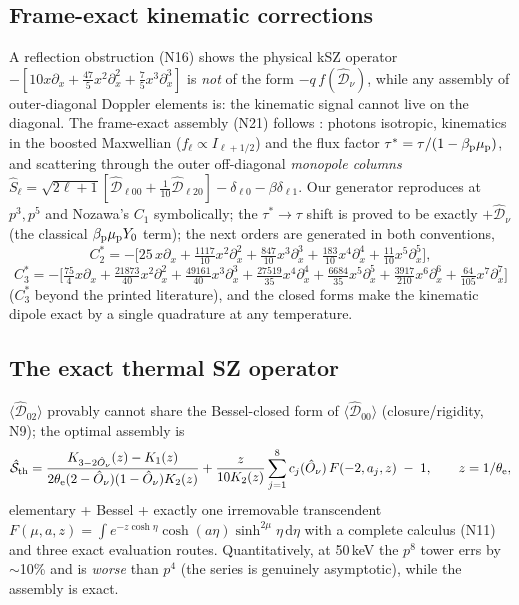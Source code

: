 \documentclass[useAMS,usenatbib]{article}
\newcommand{\Oh}{\hat{O}_\nu}
\newcommand{\Dv}{\hat{\mathcal{D}}_\nu}
\newcommand{\Do}{\hat{\mathcal{D}}}
\newcommand{\dd}{\mathrm{d}}
\begin{document}
\subsection{Frame-exact kinematic corrections}
A reflection obstruction (N16) shows the physical kSZ operator
$-[10x\partial_x + \tfrac{47}5x^2\partial_x^2 + \tfrac75x^3\partial_x^3]$ \citep{Nozawa1998} is \emph{not} of
the form $-q\,f(\Dv)$, while any assembly of outer-diagonal Doppler elements is: the kinematic signal cannot
live on the diagonal. The frame-exact assembly (N21) follows \citet[\S3]{CR26}: photons isotropic, kinematics
in the boosted Maxwellian ($f_\ell\propto I_{\ell+1/2}$) and the flux factor
$\tau^* = \tau/(1-\beta_{\rm p}\mu_{\rm p})$, and scattering through the outer off-diagonal
\emph{monopole columns} $\hat S_\ell = \sqrt{2\ell+1}[\Do_{\ell00}+\tfrac1{10}\Do_{\ell20}] - \delta_{\ell0}
- \beta\delta_{\ell1}$. Our generator reproduces \citet[Eq.~28]{CR26} at $p^3, p^5$ and Nozawa's $C_1$
symbolically; the $\tau^*\!\to\!\tau$ shift is proved to be exactly $+\Dv$ (the classical
$\beta_{\rm p}\mu_{\rm p}Y_0$ term); the next orders are generated in both conventions,
\begin{equation}
  C_2^{*} = -\Big[25\,x\partial_x + \tfrac{1117}{10}x^2\partial_x^2 + \tfrac{847}{10}x^3\partial_x^3
  + \tfrac{183}{10}x^4\partial_x^4 + \tfrac{11}{10}x^5\partial_x^5\Big],
\end{equation}
\begin{equation}
  C_3^{*} = -\Big[\tfrac{75}{4}x\partial_x + \tfrac{21873}{40}x^2\partial_x^2 + \tfrac{49161}{40}x^3\partial_x^3
  + \tfrac{27519}{35}x^4\partial_x^4 + \tfrac{6684}{35}x^5\partial_x^5 + \tfrac{3917}{210}x^6\partial_x^6
  + \tfrac{64}{105}x^7\partial_x^7\Big]
\end{equation}
($C_3^*$ beyond the printed literature), and the closed forms make the kinematic dipole exact by a single
quadrature at any temperature.

\subsection{The exact thermal SZ operator}
$\langle\Do_{02}\rangle$ provably cannot share the Bessel-closed form of $\langle\Do_{00}\rangle$
(closure/rigidity, N9); the optimal assembly is
\begin{equation}
  \hat{\mathcal S}_{\rm th}
  = \frac{K_{3-2\Oh}(z) - K_1(z)}{2\theta_{\rm e}(2-\Oh)(1-\Oh)K_2(z)}
  + \frac{z}{10K_2(z)}\sum_{j=1}^{8}c_j(\Oh)\,F(-2,a_j,z)\;-\;1,
  \qquad z = 1/\theta_{\rm e},
\end{equation}
elementary + Bessel + exactly one irremovable transcendent $F(\mu,a,z) = \int e^{-z\cosh\eta}\cosh(a\eta)
\sinh^{2\mu}\eta\,\dd\eta$ with a complete calculus (N11) and three exact evaluation routes. Quantitatively, at
50\,keV the $p^8$ tower errs by $\sim$10\% and is \emph{worse} than $p^4$ (the series is genuinely asymptotic),
while the assembly is exact.
\end{document}
